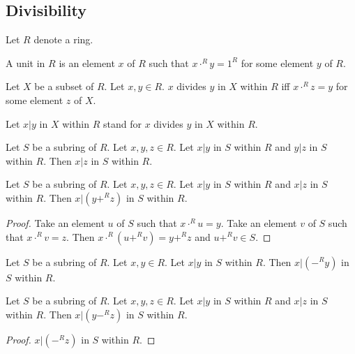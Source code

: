 \documentclass[11pt]{article}
\begin{document}
\subsection{Divisibility}

\begin{forthel}

Let $R$ denote a ring.

\begin{definition}
A unit in $R$ is an element $x$ of $R$ such that $x \cdot^{R} y = 1^{R}$
for some element $y$ of $R$. 
\end{definition}

\begin{definition} Let $X$ be a subset of $R$. Let $x,y \in R$. 
$x$ divides $y$ in $X$ within $R$ iff 
$x \cdot^{R} z = y$ for some element $z$ of $X$.
\end{definition}

Let $x | y$ in $X$ within $R$ stand for $x$ divides $y$ in $X$ within $R$.

\begin{lemma} Let $S$ be a subring of $R$.
Let $x,y,z \in R$. Let $x | y$ in $S$ within $R$ and $y | z$ in $S$ within $R$.
Then $x | z$ in $S$ within $R$.
\end{lemma}

\begin{lemma} Let $S$ be a subring of $R$.
Let $x,y,z \in R$. Let $x | y$ in $S$ within $R$ and $x | z$ in $S$ within $R$.
Then $x | (y +^{R} z)$ in $S$ within $R$.
\end{lemma}
\begin{proof}
Take an element $u$ of $S$ such that $x \cdot^{R} u = y$.
Take an element $v$ of $S$ such that $x \cdot^{R} v = z$.
Then $x \cdot^{R} (u +^{R} v) = y +^{R} z$ and $u +^{R} v \in S$. 
\end{proof}

\begin{lemma} Let $S$ be a subring of $R$.
Let $x,y\in R$. Let $x | y$ in $S$ within $R$.
Then $x | (-^{R} y)$ in $S$ within $R$.
\end{lemma}

\begin{lemma} Let $S$ be a subring of $R$.
Let $x,y,z \in R$. Let $x | y$ in $S$ within $R$ and $x | z$ in $S$ within $R$.
Then $x | (y -^{R} z)$ in $S$ within $R$.
\end{lemma}
\begin{proof}
$x | (-^{R} z)$ in $S$ within $R$.
\end{proof}

\end{forthel}
\end{document}

